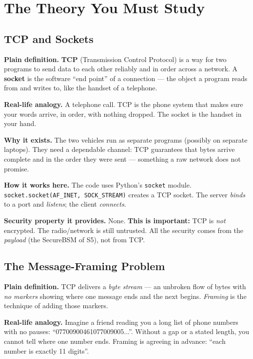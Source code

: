 \documentclass[11pt,a4paper]{report}
\begin{document}
\section{The Theory You Must Study}

\subsection{TCP and Sockets}
\textbf{Plain definition.} \textbf{TCP} (Transmission Control Protocol) is a way
for two programs to send data to each other reliably and in order across a
network. A \textbf{socket} is the software ``end point'' of a connection --- the
object a program reads from and writes to, like the handset of a telephone.

\textbf{Real-life analogy.} A telephone call. TCP is the phone system that makes
sure your words arrive, in order, with nothing dropped. The socket is the handset
in your hand.

\textbf{Why it exists.} The two vehicles run as separate programs (possibly on
separate laptops). They need a dependable channel: TCP guarantees that bytes
arrive complete and in the order they were sent --- something a raw network does
not promise.

\textbf{How it works here.} The code uses Python's \texttt{socket} module.
\texttt{socket.socket(AF\_INET, SOCK\_STREAM)} creates a TCP socket. The server
\emph{binds} to a port and \emph{listens}; the client \emph{connects}.

\textbf{Security property it provides.} None. \textbf{This is important:} TCP is
\emph{not} encrypted. The radio/network is still untrusted. All the security
comes from the \emph{payload} (the SecureBSM of S5), not from TCP.

\subsection{The Message-Framing Problem}
\textbf{Plain definition.} TCP delivers a \emph{byte stream} --- an unbroken flow
of bytes with \emph{no markers} showing where one message ends and the next
begins. \emph{Framing} is the technique of adding those markers.

\textbf{Real-life analogy.} Imagine a friend reading you a long list of phone
numbers with no pauses: ``07700900461077009005...''. Without a gap or a stated
length, you cannot tell where one number ends. Framing is agreeing in advance:
``each number is exactly 11 digits''.
\end{document}
